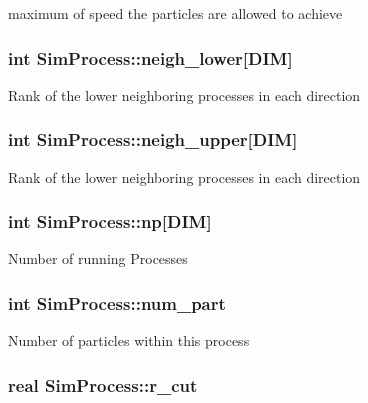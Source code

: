 maximum of speed the particles are allowed to achieve \hypertarget{class_sim_process_a6ae71932cae5aff19988c1192ec4f67b}{
\subsubsection[{neigh\-\_\-lower}]{\setlength{\rightskip}{0pt plus 5cm}int Sim\-Process\-::neigh\-\_\-lower\mbox{[}D\-I\-M\mbox{]}}}\label{class_sim_process_a6ae71932cae5aff19988c1192ec4f67b}
Rank of the lower neighboring processes in each direction \hypertarget{class_sim_process_ada0a3a713c8996789bb3a492d9270957}{
\subsubsection[{neigh\-\_\-upper}]{\setlength{\rightskip}{0pt plus 5cm}int Sim\-Process\-::neigh\-\_\-upper\mbox{[}D\-I\-M\mbox{]}}}\label{class_sim_process_ada0a3a713c8996789bb3a492d9270957}
Rank of the lower neighboring processes in each direction \hypertarget{class_sim_process_aa8d2ec90bd4b578d85a7668bb890b6e5}{
\subsubsection[{np}]{\setlength{\rightskip}{0pt plus 5cm}int Sim\-Process\-::np\mbox{[}D\-I\-M\mbox{]}}}\label{class_sim_process_aa8d2ec90bd4b578d85a7668bb890b6e5}
Number of running Processes \hypertarget{class_sim_process_abaafb96c0e7dfea4a845266511edebaa}{
\subsubsection[{num\-\_\-part}]{\setlength{\rightskip}{0pt plus 5cm}int Sim\-Process\-::num\-\_\-part}}\label{class_sim_process_abaafb96c0e7dfea4a845266511edebaa}
Number of particles within this process \hypertarget{class_sim_process_a20db5f22c2255a68a332b950897cbdb0}{
\subsubsection[{r\-\_\-cut}]{\setlength{\rightskip}{0pt plus 5cm}real Sim\-Process\-::r\-\_\-cut}}\label{class_sim_process_a20db5f22c2255a68a332b950897cbdb0}
